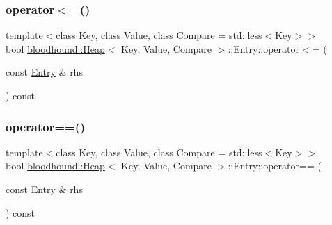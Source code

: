 \mbox{\label{structbloodhound_1_1Heap_1_1Entry_a334618ef77d48b67a148d2f7414416e2}} 
\subsubsection{\texorpdfstring{operator$<$=()}{operator<=()}}
{\footnotesize\ttfamily template$<$class Key, class Value, class Compare = std\+::less$<$\+Key$>$$>$ \\
bool \hyperlink{classbloodhound_1_1Heap}{bloodhound\+::\+Heap}$<$ Key, Value, Compare $>$\+::Entry\+::operator$<$= (\begin{DoxyParamCaption}\item[{const \hyperlink{structbloodhound_1_1Heap_1_1Entry}{Entry} \&}]{rhs }\end{DoxyParamCaption}) const\hspace{0.3cm}{\ttfamily [inline]}}

\mbox{\label{structbloodhound_1_1Heap_1_1Entry_a83880fd9d00a65e577e75f6dacee0322}} 
\subsubsection{\texorpdfstring{operator==()}{operator==()}}
{\footnotesize\ttfamily template$<$class Key, class Value, class Compare = std\+::less$<$\+Key$>$$>$ \\
bool \hyperlink{classbloodhound_1_1Heap}{bloodhound\+::\+Heap}$<$ Key, Value, Compare $>$\+::Entry\+::operator== (\begin{DoxyParamCaption}\item[{const \hyperlink{structbloodhound_1_1Heap_1_1Entry}{Entry} \&}]{rhs }\end{DoxyParamCaption}) const\hspace{0.3cm}{\ttfamily [inline]}}

\mbox{\label{structbloodhound_1_1Heap_1_1Entry_a5425815681ee88c97babbee6e9b8c0eb}} 
